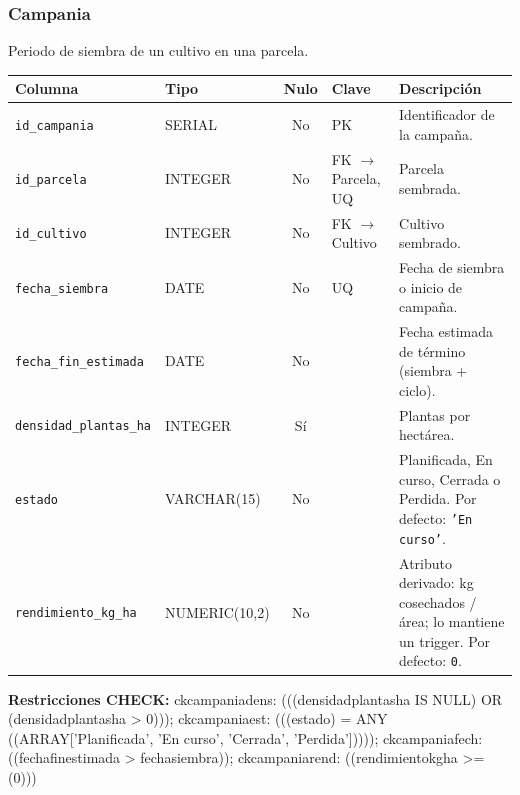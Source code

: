 \documentclass[11pt,letterpaper]{article}
\newcommand{\tbus}{\textunderscore\allowbreak}
\newcommand{\tb}[1]{{\ttfamily\let\_\tbus #1}}
\begin{document}
\subsubsection*{Campania}
Periodo de siembra de un cultivo en una parcela.
{\footnotesize
\begin{longtable}{>{\raggedright\arraybackslash}p{3.3cm}>{\raggedright\arraybackslash}p{2.5cm}c>{\raggedright\arraybackslash}p{2.2cm}>{\raggedright\arraybackslash}p{6.1cm}}
\toprule
\textbf{Columna} & \textbf{Tipo} & \textbf{Nulo} & \textbf{Clave} & \textbf{Descripción} \\
\midrule
\endhead
\texttt{id\_campania} & SERIAL & No & PK & Identificador de la campaña. \\
\texttt{id\_parcela} & INTEGER & No & FK $\to$ Parcela, UQ & Parcela sembrada. \\
\texttt{id\_cultivo} & INTEGER & No & FK $\to$ Cultivo & Cultivo sembrado. \\
\texttt{fecha\_siembra} & DATE & No & UQ & Fecha de siembra o inicio de campaña. \\
\texttt{fecha\_fin\_estimada} & DATE & No &  & Fecha estimada de término (siembra + ciclo). \\
\texttt{densidad\_plantas\_ha} & INTEGER & Sí &  & Plantas por hectárea. \\
\texttt{estado} & VARCHAR(15) & No &  & Planificada, En curso, Cerrada o Perdida. Por defecto: \texttt{'En curso'}. \\
\texttt{rendimiento\_kg\_ha} & NUMERIC(10,2) & No &  & Atributo derivado: kg cosechados / área; lo mantiene un trigger. Por defecto: \texttt{0}. \\
\bottomrule
\end{longtable}}
{\footnotesize\textbf{Restricciones CHECK:} \tb{ck\_campania\_dens}: \tb{(((densidad\_plantas\_ha IS NULL) OR (densidad\_plantas\_ha > 0)))}; \tb{ck\_campania\_est}: \tb{(((estado) = ANY ((ARRAY['Planificada', 'En curso', 'Cerrada', 'Perdida']))))}; \tb{ck\_campania\_fech}: \tb{((fecha\_fin\_estimada > fecha\_siembra))}; \tb{ck\_campania\_rend}: \tb{((rendimiento\_kg\_ha >= (0)))}\par}
\medskip
\end{document}

